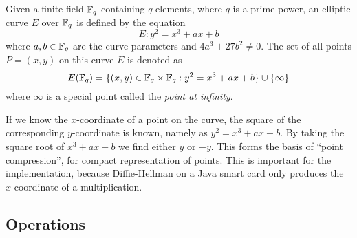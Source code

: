 \begin{definition}\label{def:elliptic_curve}
  Given a finite field $\mathbb{F}_{q}$ containing $q$ elements, where $q$ is a prime
  power, an elliptic curve $E$ over $\mathbb{F}_{q}$ is defined by the equation
  \begin{equation}\label{eqn:elliptic_curve}
    E: y^2 = x^3 + a x + b
  \end{equation}
  where $a, b \in \mathbb{F}_{q}$ are the curve parameters and $4 a^3 + 27 b^2 \neq 0$.
  The set of all points $P = (x, y)$ on this curve $E$ is denoted as
  \begin{equation*}
    E(\mathbb{F}_{q}) = \{ (x, y) \in \mathbb{F}_{q} \times \mathbb{F}_{q} : y^2 = x^3 + a x + b \}
                         \cup \{ \infty \}
  \end{equation*}
  where $\infty$ is a special point called the \emph{point at infinity}.
\end{definition}

If we know the $x$-coordinate of a point on the curve, the square of the
corresponding $y$-coordinate is known, namely as $y^{2} = x^{3} + ax + b$.
By taking the square root of $x^{3} + ax + b$ we find either $y$ or $-y$.
This forms the basis of ``point compression'', for compact representation
of points.  This is important for the implementation, because Diffie-Hellman
on a Java smart card only produces the $x$-coordinate of a multiplication.

\subsection{Operations}

